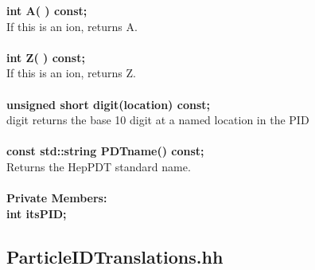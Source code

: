 \documentclass[twoside,12pt]{article}
\begin{document}
\begin{tabbing}
\hspace{0.5in}  {\bf int A( ) const; }\\
\hspace{0.5in}  If this is an ion, returns A.\\ \\
\hspace{0.5in}  {\bf int Z( ) const; }\\
\hspace{0.5in}  If this is an ion, returns Z.\\ \\
\hspace{0.5in}  {\bf unsigned short digit(location) const; }\\
\hspace{0.5in}  digit returns the base 10 digit at a named location in the PID \\ \\
\hspace{0.5in}  {\bf const std::string PDTname() const; }\\
\hspace{0.5in}  Returns the HepPDT standard name. \\ \\

{\bf Private Members:} \\
\hspace{0.5in}  {\bf int itsPID; } \\

\end{tabbing}

\vfill\eject

\subsection {ParticleIDTranslations.hh}
\end{document}
